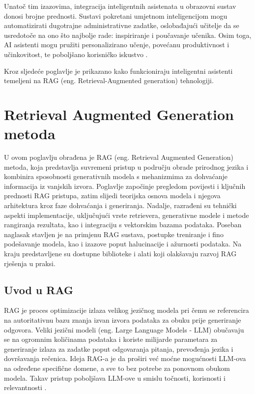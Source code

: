 \documentclass[]{foi}
\begin{document}
Unatoč tim izazovima, integracija inteligentnih asistenata u obrazovni sustav donosi brojne prednosti. Sustavi pokretani umjetnom inteligencijom mogu automatizirati dugotrajne administrativne
zadatke, oslobađajući učitelje da se usredotoče na ono što najbolje rade: inspiriranje i poučavanje učenika. Osim toga, AI asistenti mogu pružiti personalizirano učenje, povećanu produktivnost
i učinkovitost, te poboljšano korisničko iskustvo \cite{weber2025smythos}.

Kroz sljedeće poglavlje je prikazano kako funkcioniraju inteligentni asistenti temeljeni na RAG (eng. Retrieval-Augmented generation) tehnologiji.
\newpage
\chapter{Retrieval Augmented Generation metoda}

U ovom poglavlju obrađena je RAG (eng. Retrieval Augmented Generation) metoda, koja predstavlja suvremeni pristup u području obrade prirodnog jezika i kombinira sposobnosti generativnih modela
s mehanizmima za dohvaćanje informacija iz vanjskih izvora. Poglavlje započinje pregledom povijesti i ključnih prednosti RAG pristupa, zatim slijedi teorijska osnova modela i njegova arhitektura
kroz faze dohvaćanja i generiranja. Nadalje, razrađeni su tehnički aspekti implementacije, uključujući vrste retrievera, generativne modele i metode rangiranja rezultata, kao i integraciju s 
vektorskim bazama podataka. Poseban naglasak stavljen je na primjenu RAG sustava, postupke treniranje i fino podešavanje modela, kao i izazove poput halucinacije i ažurnosti podataka.
Na kraju predstavljene su dostupne biblioteke i alati koji olakšavaju razvoj RAG rješenja u praksi. 

\section{Uvod u RAG}

RAG je proces optimizacije izlaza velikog jezičnog modela pri čemu se referencira na autoritativnu bazu znanja izvan izvora podataka za obuku 
prije generiranje odgovora. Veliki jezični modeli (eng. Large Language Models - LLM) obučavaju se na ogromnim količinama podataka i koriste milijarde parametara za 
generiranje izlaza za zadatke poput odgovaranja pitanja, prevođenja jezika i dovršavanja rečenica. Ideja RAG-a je da proširi već moćne mogućnosti 
LLM-ova na određene specifične domene, a sve to bez potrebe za ponovnom obukom modela. Takav pristup poboljšava LLM-ove u smislu točnosti, 
korisnosti i relevantnosti \cite{awsRAG2025}.
\end{document}
